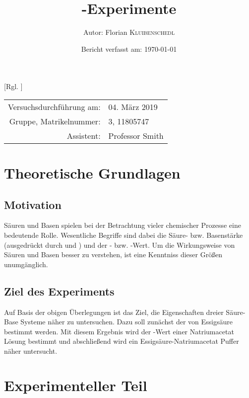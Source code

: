 \documentclass{article}
\title{\pH-Experimente} %
\author{Autor: Florian \textsc{Kluibenschedl}} %
\date{Bericht verfasst am: \today} %
\begin{document}
  [Rgl. ]{}{}
  
  \maketitle %
  
  \begin{center}
    \begin{tabular}{r l}
      Versuchsdurchführung am: & 04. März 2019\\ %
      Gruppe, Matrikelnummer: & 3, 11805747 \\
      Assistent: & Professor Smith %
    \end{tabular}
  \end{center}


  \begin{abstract}
    
  \end{abstract}
  
  \section{Theoretische Grundlagen}
  
    \subsection{Motivation} \label{sec:Motivation}
      Säuren und Basen spielen bei der Betrachtung vieler chemischer Prozesse eine bedeutende Rolle. Wesentliche Begriffe sind dabei die Säure- bzw. Basenstärke (ausgedrückt durch \pKa und \pKb) und der \pH- bzw. \pOH-Wert. Um die Wirkungsweise von Säuren und Basen besser zu verstehen, ist eine Kenntniss dieser Größen unumgänglich.  
  
    \subsection{Ziel des Experiments}
    
      Auf Basis der obigen Überlegungen ist das Ziel, die Eigenschaften dreier Säure-Base Systeme näher zu untersuchen. Dazu soll zunächst der \pKa von Essigsäure bestimmt werden. Mit diesem Ergebnis wird der \pH-Wert einer Natriumacetat Lösung bestimmt und abschließend wird ein Essigsäure-Natriumacetat Puffer näher untersucht.
    
  \section{Experimenteller Teil}
    
\end{document}
